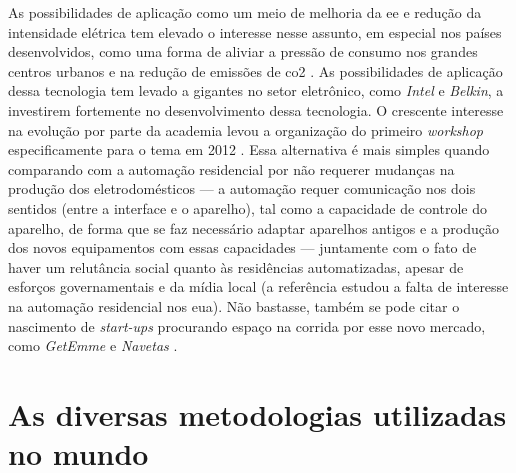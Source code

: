 As possibilidades de aplicação como um meio de melhoria da \gls{ee} e
redução da intensidade elétrica tem elevado o interesse nesse assunto,
em especial nos países desenvolvidos, como uma forma de aliviar
a pressão de consumo nos grandes centros urbanos e na redução de
emissões de \gls{co2} \cite{nilm_zeifman_review_2011}.
As possibilidades de aplicação dessa tecnologia tem levado a gigantes
no setor eletrônico, como \emph{Intel} e \emph{Belkin}, a investirem
fortemente no desenvolvimento dessa tecnologia. O crescente interesse
na evolução por parte da academia levou a organização do primeiro
\emph{workshop} especificamente para o tema em 2012
\cite{workshop_nilm}. Essa alternativa é mais simples quando
comparando com a automação residencial por não requerer mudanças na
produção dos eletrodomésticos --- a automação requer comunicação nos
dois sentidos (entre a interface e o aparelho), tal como a capacidade
de controle do aparelho, de forma que se faz necessário adaptar
aparelhos antigos e a produção dos novos equipamentos com essas
capacidades --- juntamente com o fato de haver um relutância social
quanto às residências automatizadas, apesar de esforços governamentais
e da mídia local \cite{Lipoff_Automation_2010} (a referência estudou a
falta de interesse na automação residencial nos \gls{eua}). Não
bastasse, também se pode citar o nascimento de \emph{start-ups}
procurando espaço na corrida por esse novo mercado, como
\emph{GetEmme} \cite{getemme_site} e \emph{Navetas}
\cite{navetas_site}.

\section{As diversas metodologias utilizadas no mundo}
\label{sec:nilm_mundo}

